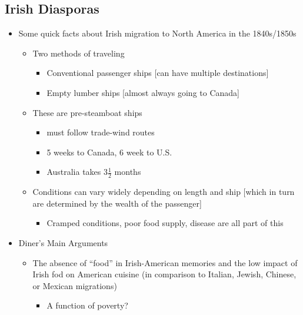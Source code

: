 \documentclass[12pt]{article}
\begin{document}
        \subsection{Irish Diasporas}
            \begin{itemize}
                \item Some quick facts about Irish migration to North America in the 1840s/1850s
                \begin{itemize}
                    \item Two methods of traveling
                    \begin{itemize}
                        \item Conventional passenger ships [can have multiple destinations]
                        \item Empty lumber ships [almost always going to Canada]
                    \end{itemize}
                    \item These are pre-steamboat ships
                    \begin{itemize}
                        \item must follow trade-wind routes
                        \item 5 weeks to Canada, 6 week to U.S.
                        \item Australia takes $3\frac{1}{2}$ months
                    \end{itemize}
                    \item Conditions can vary widely depending on length and ship [which in turn are determined by the wealth of the passenger]
                    \begin{itemize}
                        \item Cramped conditions, poor food supply, disease are all part of this
                    \end{itemize}
                \end{itemize}
                \item Diner's Main Arguments
                \begin{itemize}
                    \item The absence of ``food'' in Irish-American memories and the low impact of Irish fod on American cuisine (in comparison to Italian, Jewish, Chinese, or Mexican migrations)
                    \begin{itemize}
                        \item A function of poverty?

\end{itemize}
\end{itemize}
\end{itemize}
\end{document}
